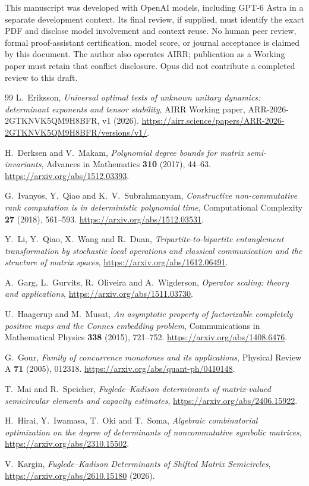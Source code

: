 \documentclass[11pt,a4paper]{article}
\theoremstyle{remark}\newtheorem{remark}[theorem]{Remark}
\begin{document}
This manuscript was developed with OpenAI models, including GPT-6 Astra in a separate development context. Its final review, if supplied, must identify the exact PDF and disclose model involvement and context reuse. No human peer review, formal proof-assistant certification, model score, or journal acceptance is claimed by this document. The author also operates AIRR; publication as a Working paper must retain that conflict disclosure. Opus did not contribute a completed review to this draft.

\begin{thebibliography}{99}
L.~Eriksson,
\emph{Universal optimal tests of unknown unitary dynamics: determinant exponents and tensor stability},
AIRR Working paper, ARR-2026-2GTKNVK5QM9H8BFR, v1 (2026).
\url{https://airr.science/papers/ARR-2026-2GTKNVK5QM9H8BFR/versions/v1/}.

H.~Derksen and V.~Makam,
\emph{Polynomial degree bounds for matrix semi-invariants},
Advances in Mathematics \textbf{310} (2017), 44--63.
\url{https://arxiv.org/abs/1512.03393}.

G.~Ivanyos, Y.~Qiao and K.~V.~Subrahmanyam,
\emph{Constructive non-commutative rank computation is in deterministic polynomial time},
Computational Complexity \textbf{27} (2018), 561--593.
\url{https://arxiv.org/abs/1512.03531}.

Y.~Li, Y.~Qiao, X.~Wang and R.~Duan,
\emph{Tripartite-to-bipartite entanglement transformation by stochastic local operations and classical communication and the structure of matrix spaces},
\url{https://arxiv.org/abs/1612.06491}.

A.~Garg, L.~Gurvits, R.~Oliveira and A.~Wigderson,
\emph{Operator scaling: theory and applications},
\url{https://arxiv.org/abs/1511.03730}.

U.~Haagerup and M.~Musat,
\emph{An asymptotic property of factorizable completely positive maps and the Connes embedding problem},
Communications in Mathematical Physics \textbf{338} (2015), 721--752.
\url{https://arxiv.org/abs/1408.6476}.

G.~Gour,
\emph{Family of concurrence monotones and its applications},
Physical Review A \textbf{71} (2005), 012318.
\url{https://arxiv.org/abs/quant-ph/0410148}.

T.~Mai and R.~Speicher,
\emph{Fuglede--Kadison determinants of matrix-valued semicircular elements and capacity estimates},
\url{https://arxiv.org/abs/2406.15922}.

H.~Hirai, Y.~Iwamasa, T.~Oki and T.~Soma,
\emph{Algebraic combinatorial optimization on the degree of determinants of noncommutative symbolic matrices},
\url{https://arxiv.org/abs/2310.15502}.

V.~Kargin,
\emph{Fuglede--Kadison Determinants of Shifted Matrix Semicircles},
\url{https://arxiv.org/abs/2610.15180} (2026).
\end{thebibliography}
\end{document}
